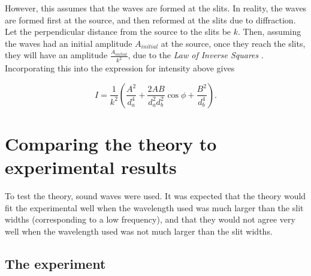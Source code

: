 \documentclass{paper}
\begin{document}
However, this assumes that the waves are formed at the slits. In reality,
the waves are formed first at the source, and then reformed at the slits due
to diffraction. Let the perpendicular distance from the source to the slits be $k$. 
Then, assuming the waves had an initial amplitude $A_{initial}$
at the source, once they reach the slits, they will have an amplitude $\frac{A_{initial}}{k^2}$,
due to the \textit{Law of Inverse Squares} \parencite{inverse-square}.
Incorporating this into the expression for intensity above gives

\begin{equation}
\label{eq:expression-for-intensity}
    I = \frac{1}{k^2}\left(\frac{A^2}{d_a^4} + 
    \frac{2AB}{d_{a}^{2}d_{b}^{2}}\cos{\phi} + \frac{B^2}{d_b^4}\right).
\end{equation}

\section{Comparing the theory to experimental results}

To test the theory, sound waves were used. It was expected that the theory
would fit the experimental well when the wavelength used was much larger than
the slit widths (corresponding to a low frequency), and that they would not agree
very well when the wavelength used was not much larger than the slit widths.

\subsection{The experiment}
                
\end{document}

